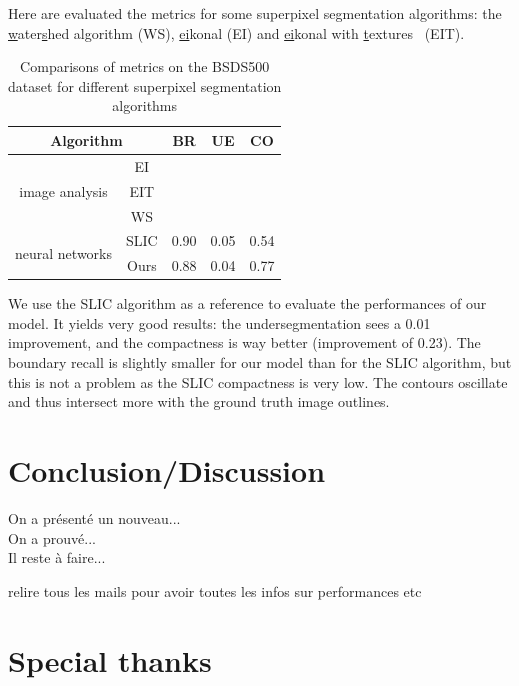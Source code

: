 \documentclass{article}
\begin{document}
        Here are evaluated the metrics for some superpixel segmentation algorithms: the \underline{w}ater\underline{s}hed algorithm (WS), \underline{ei}konal (EI) and \underline{ei}konal with \underline{t}extures~\cite{todo metrics dans larticle} (EIT).
        \cite{todo}
        \begin{table}[!ht]
            \centering
            \begin{tabular}{|c|c|ccc|}
                \hline
                \multicolumn{2}{|c|}{Algorithm} & BR & UE & CO\\
                \hline
                \hline
                \multirow{3}{*}{image analysis} & EI & & & \\
                                                & EIT & & & \\
                                                & WS & & & \\
                \hline
                \multirow{2}{*}{neural networks} & SLIC & 0.90 & 0.05 & 0.54\\
                                                 & Ours & 0.88 & 0.04 & 0.77\\
                \hline
            \end{tabular}
            \caption{Comparisons of metrics on the BSDS500 dataset for different superpixel segmentation algorithms}
        \end{table}
        \par
        We use the SLIC algorithm as a reference to evaluate the performances of our model. It yields very good results: the undersegmentation sees a 0.01 improvement, and the compactness is way better (improvement of 0.23). The boundary recall is slightly smaller for our model than for the SLIC algorithm, but this is not a problem as the SLIC compactness is very low. The contours oscillate and thus intersect more with the ground truth image outlines.


\section{Conclusion/Discussion}
\cite{todo}
On a présenté un nouveau...\\
On a prouvé...\\
Il reste à faire...

relire tous les mails pour avoir toutes les infos sur performances etc

\section*{Special thanks}
\end{document}
